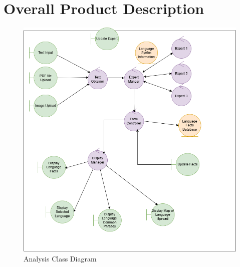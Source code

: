 \section{Overall Product Description}
\label{sec:overall_description}



\begin{figure}[H]
	\centering
	\includegraphics[width=\linewidth]{Section2/class_diagram.png}
	\caption{Analysis Class Diagram}
	\label{AnalysisClassDiagram}
\end{figure}


